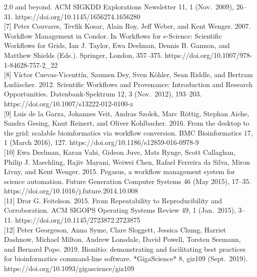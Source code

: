 \documentclass[
]{article}
\begin{document}
2.0 and beyond. ACM SIGKDD Explorations Newsletter 11, 1 (Nov.~2009),
26--31. https://doi.org/10.1145/1656274.1656280\\
{[}7{]} Peter Couvares, Tevfik Kosar, Alain Roy, Jeff Weber, and Kent
Wenger. 2007. Workflow Management in Condor. In Workflows for e-Science:
Scientific Workflows for Grids, Ian J. Taylor, Ewa Deelman, Dennis B.
Gannon, and Matthew Shields (Eds.). Springer, London, 357--375.
https://doi.org/10.1007/978-1-84628-757-2\_22\\
{[}8{]} Víctor Cuevas-Vicenttín, Saumen Dey, Sven Köhler, Sean Riddle,
and Bertram Ludäscher. 2012. Scientific Workflows and Provenance:
Introduction and Research Opportunities. Datenbank-Spektrum 12, 3
(Nov.~2012), 193--203. https://doi.org/10.1007/s13222-012-0100-z\\
{[}9{]} Luis de la Garza, Johannes Veit, Andras Szolek, Marc Röttig,
Stephan Aiche, Sandra Gesing, Knut Reinert, and Oliver Kohlbacher. 2016.
From the desktop to the grid: scalable bioinformatics via workflow
conversion. BMC Bioinformatics 17, 1 (March 2016), 127.
https://doi.org/10.1186/s12859-016-0978-9\\
{[}10{]} Ewa Deelman, Karan Vahi, Gideon Juve, Mats Rynge, Scott
Callaghan, Philip J. Maechling, Rajiv Mayani, Weiwei Chen, Rafael
Ferreira da Silva, Miron Livny, and Kent Wenger. 2015. Pegasus, a
workflow management system for science automation. Future Generation
Computer Systems 46 (May 2015), 17--35.
https://doi.org/10.1016/j.future.2014.10.008\\
{[}11{]} Dror G. Feitelson. 2015. From Repeatability to Reproducibility
and Corroboration. ACM SIGOPS Operating Systems Review 49, 1
(Jan.~2015), 3--11. https://doi.org/10.1145/2723872.2723875\\
{[}12{]} Peter Georgeson, Anna Syme, Clare Sloggett, Jessica Chung,
Harriet Dashnow, Michael Milton, Andrew Lonsdale, David Powell, Torsten
Seemann, and Bernard Pope. 2019. Bionitio: demonstrating and
facilitating best practices for bioinformatics command-line software.
*GigaScience* 8, giz109 (Sept.~2019).
https://doi.org/10.1093/gigascience/giz109
\end{document}
